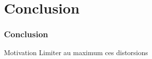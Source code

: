 \section{Conclusion}
	\begin{frame}
		\frametitle{Conclusion}
		\begin{block}{Motivation}
			Limiter au maximum ces distorsions
		\end{block}	
\end{frame}